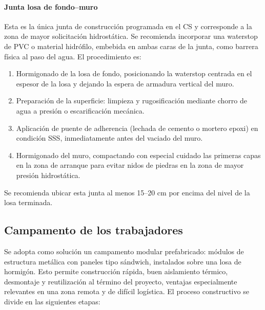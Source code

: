\paragraph{Junta losa de fondo--muro}

Esta es la única junta de construcción programada en el CS y corresponde a la zona de mayor solicitación hidrostática. Se recomienda incorporar una waterstop de PVC o material hidrófilo, embebida en ambas caras de la junta, como barrera física al paso del agua. El procedimiento es:

\begin{enumerate}
    \item Hormigonado de la losa de fondo, posicionando la waterstop centrada en el espesor de la losa y dejando la espera de armadura vertical del muro.
    \item Preparación de la superficie: limpieza y rugosificación mediante chorro de agua a presión o escarificación mecánica.
    \item Aplicación de puente de adherencia (lechada de cemento o mortero epoxi) en condición SSS, inmediatamente antes del vaciado del muro.
    \item Hormigonado del muro, compactando con especial cuidado las primeras capas en la zona de arranque para evitar nidos de piedras en la zona de mayor presión hidrostática.
\end{enumerate}

Se recomienda ubicar esta junta al menos 15--20 cm por encima del nivel de la losa terminada.

\subsection{Campamento de los trabajadores}
\label{sec:campamento}

Se adopta como solución un campamento modular prefabricado: módulos de estructura metálica con paneles tipo sándwich, instalados sobre una losa de hormigón. Esto permite construcción rápida, buen aislamiento térmico, desmontaje y reutilización al término del proyecto, ventajas especialmente relevantes en una zona remota y de difícil logística. El proceso constructivo se divide en las siguientes etapas:


